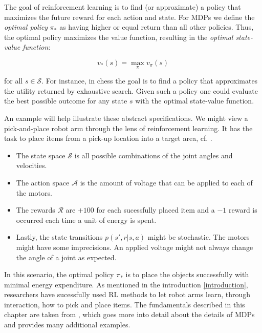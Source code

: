 The goal of reinforcement learning is to find (or approximate) a policy that maximizes the future reward for each action and state. For MDPs we define the \textit{optimal policy} $\pi_*$ as having higher or equal return than all other policies. Thus, the optimal policy maximizes the value function, resulting in the \textit{optimal state-value function}:

\begin{equation}
    v_{*}(s) = \max_{\pi} v_{\pi}(s)
\end{equation}

for all $s \in \mathcal{S}$. For instance, in chess the goal is to find a policy that approximates the utility returned by exhaustive search. Given such a policy one could evaluate the best possible outcome for any state $s$ with the optimal state-value function.

An example will help illustrate these abstract specifications. We might view a pick-and-place robot arm through the lens of reinforcement learning. It has the task to place items from a pick-up location into a target area, cf. \cite{noauthor_examples_nodate}.

\begin{itemize}
    \item The state space $ \mathcal{S} $ is all possible combinations of the joint angles and velocities.
    \item The action space $ \mathcal{A} $ is the amount of voltage that can be applied to each of the motors.
    \item The rewards $ \mathcal{R} $ are $+100$ for each sucessfully placed item and a $-1$ reward is occurred each time a unit of energy is spent.
    \item Lastly, the state transitions $p(s', r | s, a)$ might be stochastic. The motors might have some imprecisions. An applied voltage might not always change the angle of a joint as expected.
\end{itemize}

In this scenario, the optimal policy $ \pi_* $ is to place the objects successfully with minimal energy expenditure. As mentioned in the introduction \ref{introduction}, researchers have sucessfully used RL methods to let robot arms learn, through interaction, how to pick and place items. The fundamentals described in this chapter are taken from \cite[p. 47ff.]{sutton_reinforcement_2018}, which goes more into detail about the details of MDPs and provides many additional examples.

